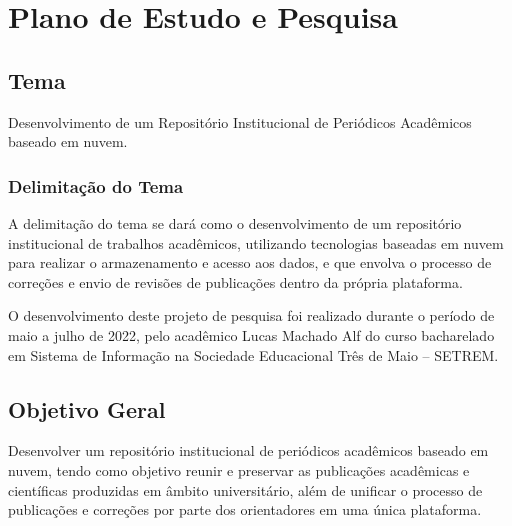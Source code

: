 \chapter{Plano de Estudo e Pesquisa} \label{chap:ResearchPlan}

\section{Tema} \label{sec::Theme}
Desenvolvimento de um Repositório Institucional de Periódicos Acadêmicos
baseado em nuvem.

\subsection{Delimitação do Tema} \label{subsec::ThemeDelimitation}

A delimitação do tema se dará como o desenvolvimento de um
repositório institucional de trabalhos acadêmicos, utilizando tecnologias
baseadas em nuvem para realizar o armazenamento e acesso aos dados,
e que envolva o processo de correções e envio de revisões de
publicações dentro da própria plataforma.

O desenvolvimento deste projeto de pesquisa foi realizado durante o período de
maio a julho de 2022, pelo acadêmico Lucas Machado Alf do curso bacharelado
em Sistema de Informação na Sociedade Educacional Três de Maio – SETREM.

\section{Objetivo Geral} \label{sec:objective}

Desenvolver um repositório institucional de periódicos acadêmicos
baseado em nuvem, tendo como objetivo reunir e preservar
as publicações acadêmicas e científicas produzidas em âmbito universitário,
além de unificar o processo de publicações e correções por parte dos orientadores
em uma única plataforma.

